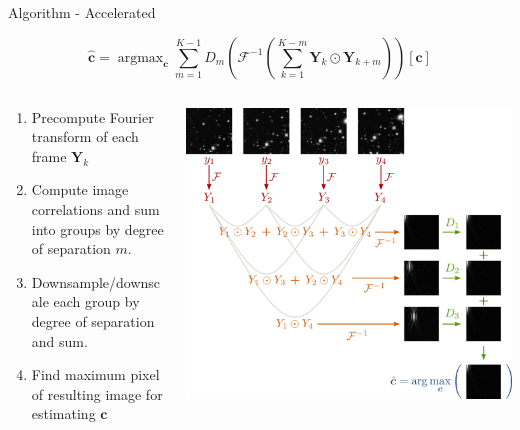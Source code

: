 \documentclass[10pt,xcolor=dvipsnames]{beamer}
\newcommand\lstar{\mkern4mu{\star}\mkern4mu}
\DeclareMathOperator*{\argmax}{\arg\max}
\begin{document}
\begin{frame}{Algorithm - Accelerated}
  \begin{block}{}
    $$
    \hat{\bm{c}} = \argmax_{\bm{c}} \sum_{m=1}^{K-1} D_m \left(
    \mathcal{F}^{-1} \left( \sum_{k=1}^{K-m} \bm{Y}_k \odot \bm{Y}_{k+m} \right)
    \right)[\bm{c}]
    $$
  \end{block}
  \begin{columns}
    \begin{column}{0.5 \textwidth}
      \begin{enumerate}
        \item {\color{Maroon} Precompute Fourier transform of each frame $\bm{Y}_k$}
        \item {\color{BurntOrange} Compute image correlations and sum into groups by degree of separation $m$.}
        \item {\color{OliveGreen}Downsample/downscale each group by degree of separation and sum.}
        \item {\color{MidnightBlue}Find maximum pixel of resulting image for estimating $\bm{c}$}
      \end{enumerate}

    \end{column}

    \begin{column}{0.6 \textwidth}
      \includegraphics[width=\textwidth]{figures/algorithm.png}
    \end{column}
  \end{columns}
\end{frame}
\end{document}
